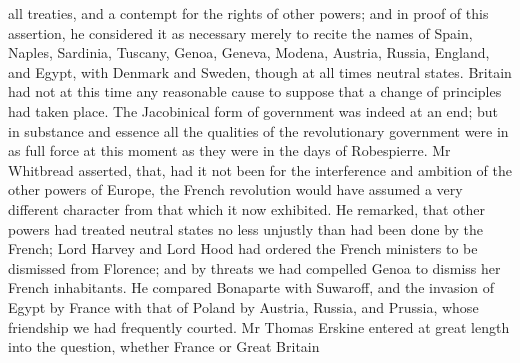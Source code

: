 \documentclass{article}
\begin{document}
all treaties, and a contempt for the rights of other powers; and in proof of this assertion, he considered it as necessary merely to recite the names of Spain, Naples, Sardinia, Tuscany, Genoa, Geneva, Modena, Austria, Russia, England, and Egypt, with Denmark and Sweden, though at all times neutral states. Britain had not at this time any reasonable cause to suppose that a change of principles had taken place. The Jacobinical form of government was indeed at an end; but in substance and essence all the qualities of the revolutionary government were in as full force at this moment as they were in the days of Robespierre. Mr Whitbread asserted, that, had it not been for the interference and ambition of the other powers of Europe, the French revolution would have assumed a very different character from that which it now exhibited. He remarked, that other powers had treated neutral states no less unjustly than had been done by the French; Lord Harvey and Lord Hood had ordered the French ministers to be dismissed from Florence; and by threats we had compelled Genoa to dismiss her French inhabitants. He compared Bonaparte with Suwaroff, and the invasion of Egypt by France with that of Poland by Austria, Russia, and Prussia, whose friendship we had frequently courted. Mr Thomas Erskine entered at great length into the question, whether France or Great Britain
\end{document}
